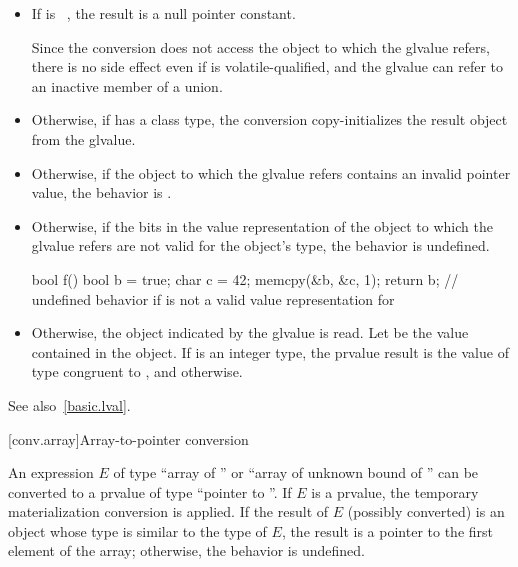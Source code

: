\begin{itemize}

\item If  is \cv{}~, the result is a
null pointer constant.
\begin{note}
Since the conversion does not access the object to which the glvalue refers,
there is no side effect even if  is volatile-qualified, and
the glvalue can refer to an inactive member of a union.
\end{note}

\item Otherwise, if  has a class
type, the conversion copy-initializes the result object from
the glvalue.

\item Otherwise, if the object to which the glvalue refers contains an invalid
pointer value, the behavior is
.

\item Otherwise, if the bits in the value representation of
the object to which the glvalue refers
are not valid for the object's type, the behavior is undefined.
\begin{example}
\begin{codeblock}
bool f() {
  bool b = true;
  char c = 42;
  memcpy(&b, &c, 1);
  return b;         // undefined behavior if  is not a valid value representation for 
}
\end{codeblock}
\end{example}

\item Otherwise, the object indicated by the glvalue is read.
Let  be the value contained in the object.
If  is an integer type,
the prvalue result is
the value of type  congruent to , and
 otherwise.
\end{itemize}

\pnum
\begin{note}
See also~\ref{basic.lval}.
\end{note}

[conv.array]{Array-to-pointer conversion}

\pnum
{}%
%
%
An expression $E$ of type ``array of  '' or ``array
of unknown bound of '' can be converted to a prvalue of type
``pointer to ''.
If $E$ is a prvalue,
the temporary materialization conversion is applied.
If the result of $E$ (possibly converted) is an object
whose type is similar to the type of $E$,
the result is a pointer to the first element of the array;
otherwise, the behavior is undefined.

